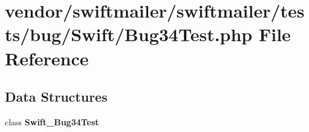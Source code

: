 \section{vendor/swiftmailer/swiftmailer/tests/bug/\+Swift/\+Bug34\+Test.php File Reference}
\label{_bug34_test_8php}
\subsection*{Data Structures}
\begin{DoxyCompactItemize}
\item 
class {\bf Swift\+\_\+\+Bug34\+Test}
\end{DoxyCompactItemize}
